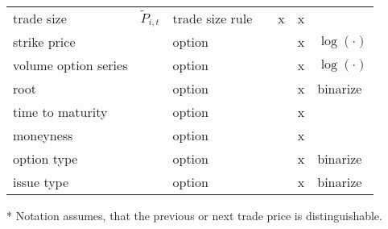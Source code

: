 \begin{threeparttable}
\begin{tabular}{@{}lllllll@{}}
        trade size                & $\tilde{P}_{i, t}$                                                                                             & trade size rule      &      & x    & x    &               \\
        strike price              &                                                                                                                & option               &      &      & x    & $\log(\cdot)$ \\
        volume option series      &                                                                                                                & option               &      &      & x    & $\log(\cdot)$ \\
        root                      &                                                                                                                & option               &      &      & x    & binarize      \\
        time to maturity          &                                                                                                                & option               &      &      & x    &               \\
        moneyness                 &                                                                                                                & option               &      &      & x    &               \\
        option type               &                                                                                                                & option               &      &      & x    & binarize      \\
        issue type                &                                                                                                                & option               &      &      & x    & binarize      \\ \bottomrule
    \end{tabular}
    \begin{tablenotes}\footnotesize
        \item[*] Notation assumes, that the previous or next trade price is distinguishable.
    \end{tablenotes}
\end{threeparttable}
